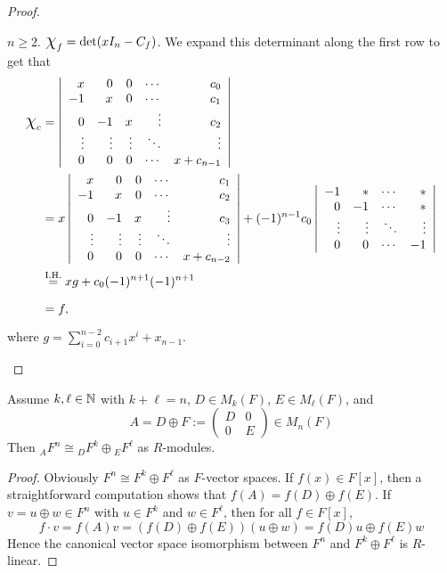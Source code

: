 \documentclass[11pt]{book}
\theoremstyle{definition}   \newtheorem{defn}[counter]{Definition} %
\newcommand{\mymatrix}[2]{\left( \begin{array}{#1} #2 \end{array} \right)}
\newcommand{\mydet}[2]{\left| \begin{array}{#1} #2 \end{array} \right|} \newcommand{\myvec}[1]{\left( \begin{array}{c} #1 \end{array} \right)}
\newcommand{\Chi}{\mbox{\Large $\chi$}}
\newcommand{\vs}{\vspace{8pt}}
\numberwithin{counter}{chapter}
\begin{document}
\begin{proof}
\begin{enumerate}
$n \geq 2$. $\Chi_f = \det (xI_n - C_f)$. We expand this determinant along the first row to get that
\begin{align*}
\Chi_c &= \mydet{rrrrr}{x & 0 & 0 & \cdots & c_0 \\
                       -1 & x & 0 & \cdots & c_1 \\
                       0 & -1 & x & \vdots  & c_2\\
                       \vdots & \vdots & \vdots & \ddots & \vdots \\
                       0 & 0 & 0 & \cdots & x + c_{n-1}} \\
                       &= x \mydet{rrrrr}{x & 0 & 0 & \cdots & c_1 \\
                                              -1 & x & 0 & \cdots & c_2 \\
                                              0 & -1 & x & \vdots  & c_3\\
                                              \vdots & \vdots & \vdots & \ddots & \vdots \\
                                              0 & 0 & 0 & \cdots & x + c_{n-2}} + (-1)^{n-1} c_0 \mydet{rrrr}{-1 & \ast & \cdots & \ast \\
                                                           0 & -1 & \cdots & \ast \\
                                                           \vdots & \vdots & \ddots & \vdots \\
                                                           0 & 0 & \cdots & -1} \\
        &\overset{\tn{I.H.}}{=} x g + c_0 (-1)^{n+1} (-1)^{n+1} \\
        &= f,
\end{align*}
where $g = \sum_{i=0}^{n-2} c_{i+1} x^i + x_{n-1}$. 
\end{enumerate}
\end{proof}

\vs

\begin{lemma}
Assume $k,\ell \in \operatorname{\mathbb{N}}$ with $k + \ell = n$, $D \in M_k(F)$, $E \in M_\ell(F)$, and 
	\[A = D \oplus F := \mymatrix{cc}{D & 0 \\ 0 & E} \in M_n(F) \]
Then ${_AF^n} \cong {_DF^k} \oplus {_EF^\ell}$ as $R$-modules. 
\end{lemma}

\begin{proof}
Obviously $F^n \cong F^k \oplus F^\ell$ as $F$-vector spaces. If $f(x) \in F[x]$, then a straightforward computation shows that $f(A) = f(D) \oplus f(E)$. If $v = u \oplus w \in F^n$ with $u \in F^k$ and $w \in F^\ell$, then for all $f \in F[x]$,
	\[f \cdot v = f(A) v = (f(D) \oplus f(E)) (u \oplus w) = f(D)u \oplus f(E)w \]
Hence the canonical vector space isomorphism between $F^n$ and $F^k \oplus F^\ell$ is $R$-linear. 
\end{proof}
\end{document}
